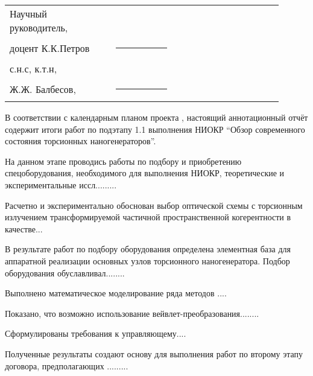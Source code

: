 \documentclass[utf-8,usehyperref,12pt]{G7-32}
\begin{document}

\frontmatter %



\Executors %
\begin{longtable}{p{0.35\linewidth}p{0.2\linewidth}p{0.35\linewidth}}
Научный руководитель, 	&		&	\\
доцент К.К.Петров	&\rule{1\linewidth}{0.1pt}	&  \\ \vspace{1cm}

с.н.с, к.т.н,  &		&	\\
Ж.Ж. Балбесов, & \rule{1\linewidth}{0.1pt}& \\
\end{longtable}

\Referat %
В соответствии с календарным планом проекта \No, настоящий аннотационный отчёт содержит итоги работ по подэтапу 1.1 выполнения НИОКР ``Обзор современного состояния торсионных наногенераторов''.

На данном этапе проводись работы по подбору и приобретению спецоборудования, необходимого для выполнения НИОКР, теоретические и экспериментальные иссл.........

Расчетно и экспериментально обоснован выбор оптической схемы с торсионным излучением трансформируемой частичной пространственной когерентности в качестве...

В результате работ по подбору оборудования определена элементная база для аппаратной реализации основных узлов торсионного наногенератора. Подбор оборудования обуславливал........

Выполнено математическое моделирование ряда методов .... 

Показано, что возможно использование вейвлет-преобразования........

Сформулированы требования к управляющему....

Полученные результаты создают основу для выполнения работ по второму этапу договора, предполагающих .........

\tableofcontents
\end{document}
